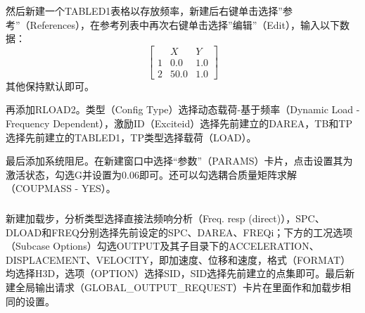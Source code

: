 \documentclass[12pt, oneside, a4paper]{ctexart}
\begin{document}
然后新建一个TABLED1表格以存放频率，新建后右键单击选择”参考”（References），在参考列表中再次右键单击选择”编辑”（Edit），输入以下数据：
\begin{equation*}
    \begin{bmatrix}
          & X    & Y   \\
        1 & 0.0  & 1.0 \\
        2 & 50.0 & 1.0
    \end{bmatrix}
\end{equation*}
其他保持默认即可。
\par{}
再添加RLOAD2。类型（Config Type）选择动态载荷-基于频率（Dynamic Load - Frequency Dependent），激励ID（Exciteid）选择先前建立的DAREA，TB和TP选择先前建立的TABLED1，TP类型选择载荷（LOAD）。
\par{}
最后添加系统阻尼。在新建窗口中选择“参数”（PARAMS）卡片，点击设置其为激活状态，勾选G并设置为0.06即可。还可以勾选耦合质量矩阵求解（COUPMASS - YES）。
\subsubsection{}
\par{}
新建加载步，分析类型选择直接法频响分析（Freq. resp (direct)），SPC、DLOAD和FREQ分别选择先前设定的SPC、DAREA、FREQi；下方的工况选项（Subcase Options）勾选OUTPUT及其子目录下的ACCELERATION、DISPLACEMENT、VELOCITY，即加速度、位移和速度，格式（FORMAT）均选择H3D，选项（OPTION）选择SID，SID选择先前建立的点集即可。最后新建全局输出请求（GLOBAL\_OUTPUT\_REQUEST）卡片在里面作和加载步相同的设置。
\end{document}
